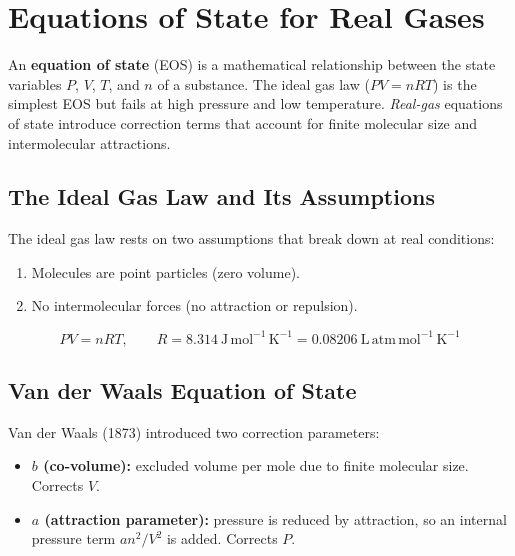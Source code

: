 \documentclass[12pt,a4paper]{article}
\begin{document}
\section{Equations of State for Real Gases}

\begin{tcolorbox}[defbox]
An \textbf{equation of state} (EOS) is a mathematical relationship between the state variables $P$, $V$, $T$, and $n$ of a substance. The ideal gas law ($PV = nRT$) is the simplest EOS but fails at high pressure and low temperature. \emph{Real-gas} equations of state introduce correction terms that account for finite molecular size and intermolecular attractions.
\end{tcolorbox}

\subsection{The Ideal Gas Law and Its Assumptions}
The ideal gas law rests on two assumptions that break down at real conditions:
\begin{enumerate}[leftmargin=*, itemsep=2pt, topsep=2pt]
  \item Molecules are point particles (zero volume).
  \item No intermolecular forces (no attraction or repulsion).
\end{enumerate}

\begin{tcolorbox}[formulabox, title={Ideal Gas Law}]
\[
PV = nRT, \qquad R = 8.314\ \mathrm{J\,mol^{-1}\,K^{-1}} = 0.08206\ \mathrm{L\,atm\,mol^{-1}\,K^{-1}}
\]
\end{tcolorbox}

\subsection{Van der Waals Equation of State}
Van der Waals (1873) introduced two correction parameters:
\begin{itemize}[leftmargin=*, itemsep=2pt, topsep=2pt]
  \item \textbf{$b$ (co-volume):} excluded volume per mole due to finite molecular size. Corrects $V$.
  \item \textbf{$a$ (attraction parameter):} pressure is reduced by attraction, so an internal pressure term $a n^2/V^2$ is added. Corrects $P$.
\end{itemize}
\end{document}
